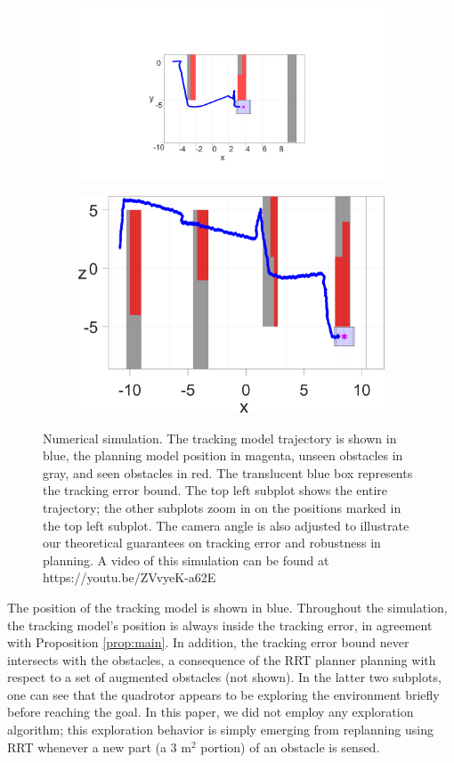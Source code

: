 \begin{figure}
	\begin{subfigure}[t]{0.49\columnwidth} \label{subfig:sim_2}
		\includegraphics[width=\columnwidth]{fig/763}
		\caption{}
	\end{subfigure}  
	\begin{subfigure}[t]{0.49\columnwidth} \label{subfig:sim_3}
		\includegraphics[width=\columnwidth]{fig/1042}
		\caption{}
	\end{subfigure}
	\caption{Numerical simulation. The tracking model trajectory is shown in blue, the planning model position in magenta, unseen obstacles in gray, and seen obstacles in red. The translucent blue box represents the tracking error bound. The top left subplot shows the entire trajectory; the other subplots zoom in on the positions marked in the top left subplot. The camera angle is also adjusted to illustrate our theoretical guarantees on tracking error and robustness in planning. A video of this simulation can be found at https://youtu.be/ZVvyeK-a62E \label{fig:sim}}
\end{figure}
The position of the tracking model is shown in blue. Throughout the simulation, the tracking model's position is always inside the tracking error, in agreement with Proposition \ref{prop:main}. In addition, the tracking error bound never intersects with the obstacles, a consequence of the RRT planner planning with respect to a set of augmented obstacles (not shown). In the latter two subplots, one can see that the quadrotor appears to be exploring the environment briefly before reaching the goal. In this paper, we did not employ any exploration algorithm; this exploration behavior is simply emerging from replanning using RRT whenever a new part (a $3$ m$^2$ portion) of an obstacle is sensed.